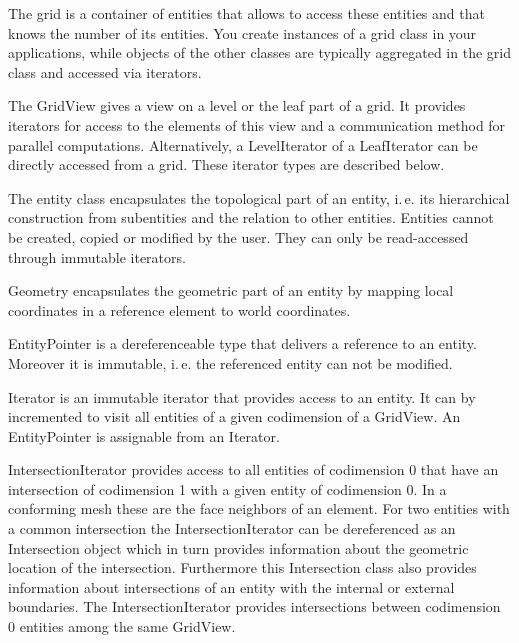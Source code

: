 \documentclass[11pt,a4paper,headinclude,footinclude,DIV16,normalheadings]{scrreprt}
\begin{document}
    The grid 
    is a container of entities that allows to access these entities
    and that knows the number of its entities. You create instances of
    a grid class in your applications, while objects of the other
    classes are typically aggregated in the grid class and accessed via
    iterators. 


    The GridView gives a view on a level or the leaf part of a grid. It
    provides iterators for access to the elements of this view and a
    communication method for parallel computations. Alternatively, a
    LevelIterator of a LeafIterator  can be directly accessed from a grid.
    These iterator types are described below.


    The entity class encapsulates
    the topological part of an entity, i.\,e. its hierarchical
    construction from subentities and the relation to other
    entities. Entities cannot be created, copied or modified by the
    user. They can only be read-accessed through immutable iterators. 


    Geometry
    encapsulates the geometric part of an entity by mapping local
    coordinates in a reference element to world coordinates. 


    EntityPointer  is a
    dereferenceable type that delivers a reference to an
    entity. Moreover it is immutable, i.\,e. the referenced entity can
    not be modified. 


    Iterator is an
    immutable iterator that provides access to an entity. It can by
    incremented to visit all entities of a given
    codimension of a GridView. An EntityPointer is assignable
    from an Iterator. 


    IntersectionIterator provides access to all entities of
    codimension 0 that have an intersection of codimension 1 with a
    given entity of codimension 0. In a conforming mesh these are the
    face neighbors of an element. For two entities with a common
    intersection the IntersectionIterator can be dereferenced as an Intersection
    object which in turn provides information about the geometric location of
    the intersection.  Furthermore this Intersection class also provides
    information about intersections of an entity
    with
    the internal or external boundaries. 
    The IntersectionIterator provides intersections between
    codimension 0 entities among the same GridView.
    
\end{document}
